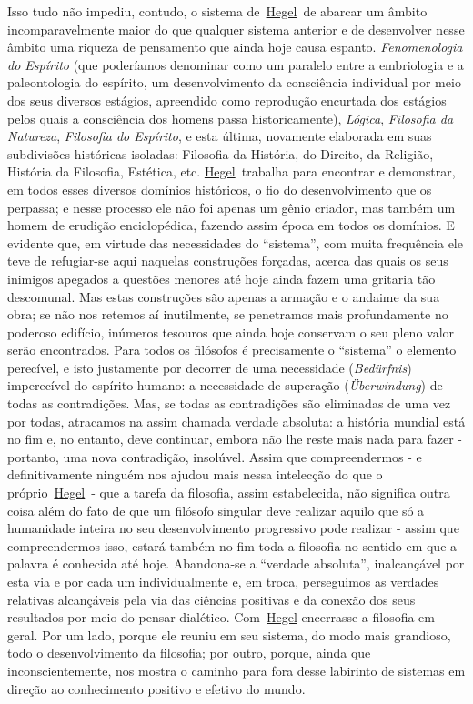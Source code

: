 Isso tudo não impediu, contudo, o sistema
de~\href{https://www.marxists.org/portugues/dicionario/verbetes/h/hegel.htm}{Hegel}~de
abarcar um âmbito incomparavelmente maior do que qualquer sistema
anterior e de desenvolver nesse âmbito uma riqueza de pensamento que
ainda hoje causa espanto. \emph{Fenomenologia do Espírito} (que
poderíamos denominar como um paralelo entre a embriologia e a
paleontologia do espírito, um desenvolvimento da consciência individual
por meio dos seus diversos estágios, apreendido como reprodução
encurtada dos estágios pelos quais a consciência dos homens passa
historicamente), \emph{Lógica}, \emph{Filosofia da Natureza},
\emph{Filosofia do Espírito}, e esta última, novamente elaborada em suas
subdivisões históricas isoladas: Filosofia da História, do Direito, da
Religião, História da Filosofia, Estética, etc.
\href{https://www.marxists.org/portugues/dicionario/verbetes/h/hegel.htm}{Hegel}~trabalha
para encontrar e demonstrar, em todos esses diversos domínios
históricos, o fio do desenvolvimento que os perpassa; e nesse processo
ele não foi apenas um gênio criador, mas também um homem de erudição
enciclopédica, fazendo assim época em todos os domínios. E evidente que,
em virtude das necessidades do ``sistema'', com muita frequência ele
teve de refugiar-se aqui naquelas construções forçadas, acerca das quais
os seus inimigos apegados a questões menores até hoje ainda fazem uma
gritaria tão descomunal. Mas estas construções são apenas a armação e o
andaime da sua obra; se não nos retemos aí inutilmente, se penetramos
mais profundamente no poderoso edifício, inúmeros tesouros que ainda
hoje conservam o seu pleno valor serão encontrados. Para todos os
filósofos é precisamente o ``sistema'' o elemento perecível, e isto
justamente por decorrer de uma necessidade (\emph{Bedürfnis})
imperecível do espírito humano: a necessidade de superação
(\emph{Überwindung}) de todas as contradições. Mas, se todas as
contradições são eliminadas de uma vez por todas, atracamos na assim
chamada verdade absoluta: a história mundial está no fim e, no entanto,
deve continuar, embora não lhe reste mais nada para fazer - portanto,
uma nova contradição, insolúvel. Assim que compreendermos - e
definitivamente ninguém nos ajudou mais nessa intelecção do que o
próprio~\href{https://www.marxists.org/portugues/dicionario/verbetes/h/hegel.htm}{Hegel}~-
que a tarefa da filosofia, assim estabelecida, não significa outra coisa
além do fato de que um filósofo singular deve realizar aquilo que só a
humanidade inteira no seu desenvolvimento progressivo pode realizar -
assim que compreendermos isso, estará também no fim toda a filosofia no
sentido em que a palavra é conhecida até hoje. Abandona-se a ``verdade
absoluta'', inalcançável por esta via e por cada um individualmente e,
em troca, perseguimos as verdades relativas alcançáveis pela via das
ciências positivas e da conexão dos seus resultados por meio do pensar
dialético.
Com~\href{https://www.marxists.org/portugues/dicionario/verbetes/h/hegel.htm}{Hegel}
encerrasse a filosofia em geral. Por um lado, porque ele reuniu em seu
sistema, do modo mais grandioso, todo o desenvolvimento da filosofia;
por outro, porque, ainda que inconscientemente, nos mostra o caminho
para fora desse labirinto de sistemas em direção ao conhecimento
positivo e efetivo do mundo.

